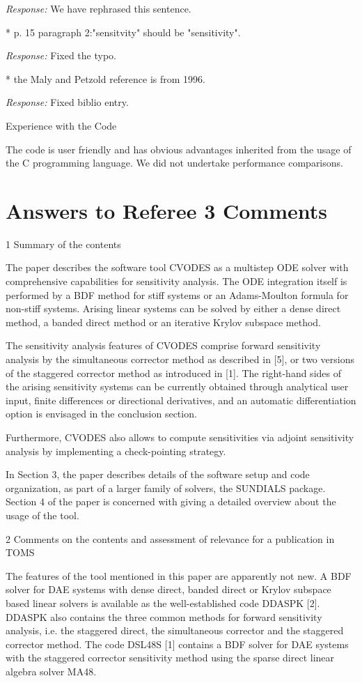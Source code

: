 {\em Response:}
We have rephrased this sentence.

* p. 15 paragraph 2:"sensitvity" should be "sensitivity".

{\em Response:}
Fixed the typo.

* the Maly and Petzold reference is from 1996.

{\em Response:} Fixed biblio entry.

Experience with the Code

The code is user friendly and has obvious advantages inherited from
the usage of the C programming language. We did not undertake
performance comparisons.


\newpage
\section{Answers to Referee 3 Comments}

1 Summary of the contents

The paper describes the software tool CVODES as a multistep ODE solver
with comprehensive capabilities for sensitivity analysis. The ODE
integration itself is performed by a BDF method for stiff systems or
an Adams-Moulton formula for non-stiff systems. Arising linear systems
can be solved by either a dense direct method, a banded direct method
or an iterative Krylov subspace method.

The sensitivity analysis features of CVODES comprise forward
sensitivity analysis by the simultaneous corrector method as described
in [5], or two versions of the staggered corrector method as
introduced in [1]. The right-hand sides of the arising sensitivity
systems can be currently obtained through analytical user input,
finite differences or directional derivatives, and an automatic
differentiation option is envisaged in the conclusion section.

Furthermore, CVODES also allows to compute sensitivities via adjoint
sensitivity analysis by implementing a check-pointing strategy.

In Section 3, the paper describes details of the software setup and
code organization, as part of a larger family of solvers, the SUNDIALS
package.  Section 4 of the paper is concerned with giving a detailed
overview about the usage of the tool.

2 Comments on the contents and assessment of relevance for a
publication in TOMS

The features of the tool mentioned in this paper are apparently not
new. A BDF solver for DAE systems with dense direct, banded direct or
Krylov subspace based linear solvers is available as the
well-established code DDASPK [2]. DDASPK also contains the three
common methods for forward sensitivity analysis, i.e. the staggered
direct, the simultaneous corrector and the staggered corrector
method. The code DSL48S [1] contains a BDF solver for DAE systems with
the staggered corrector sensitivity method using the sparse direct
linear algebra solver MA48.

